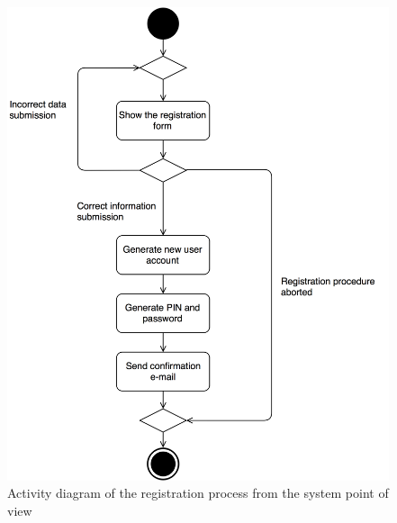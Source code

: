\begin{figure}[H]
\begin{center}
		\includegraphics[width=\textwidth]{./specific_requirements/features/diagrams/registration_activity.png}
		\caption{Activity diagram of the registration process from the system point of view}
		\label{register_act}
\end{center}
\end{figure}

